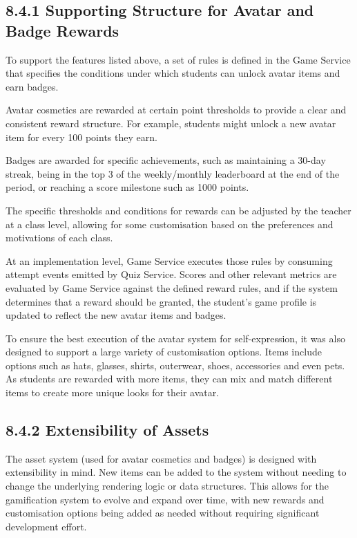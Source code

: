 \documentclass[
  12pt,
  a4paper,
]{report}
\begin{document}
\hypertarget{supporting-infrastructure-for-avatar}{%
\subsection{8.4.1 Supporting Structure for Avatar and Badge
Rewards}\label{supporting-infrastructure-for-avatar-and-badge-rewards}}

To support the features listed above, a set of rules is defined in the Game Service that
specifies the conditions under which students can unlock avatar items and earn badges.

Avatar cosmetics are rewarded at certain point thresholds to provide a
clear and consistent reward structure. For example, students might
unlock a new avatar item for every 100 points they earn.

Badges are awarded for specific achievements, such as maintaining a 30-day streak,
being in the top 3 of the weekly/monthly leaderboard at the end of the
period, or reaching a score milestone such as 1000 points.

The specific thresholds and conditions for rewards can be adjusted by the teacher at
a class level, allowing for some customisation based on the preferences
and motivations of each class.

At an implementation level, Game Service executes those rules by
consuming attempt events emitted by Quiz Service. Scores and other
relevant metrics are evaluated by Game Service against the defined reward rules,
and if the system determines that a reward should be granted, the student's
game profile is updated to reflect the new avatar items and badges.

To ensure the best execution of the avatar system for self-expression,
it was also designed to support a large variety of customisation options.
Items include options such as hats, glasses, shirts, outerwear, shoes, accessories and even pets.
As students are rewarded with more items, they can mix and match
different items to create more unique looks for their avatar.

\hypertarget{extensibility-of-assets}{%
\subsection{8.4.2 Extensibility of Assets}\label{extensibility-of-assets}}

The asset system (used for avatar cosmetics and badges) is designed with
extensibility in mind. New items can be added to the system without
needing to change the underlying rendering logic or data structures.
This allows for the gamification system to evolve and expand over time,
with new rewards and customisation options being added as needed without
requiring significant development effort.
\end{document}

